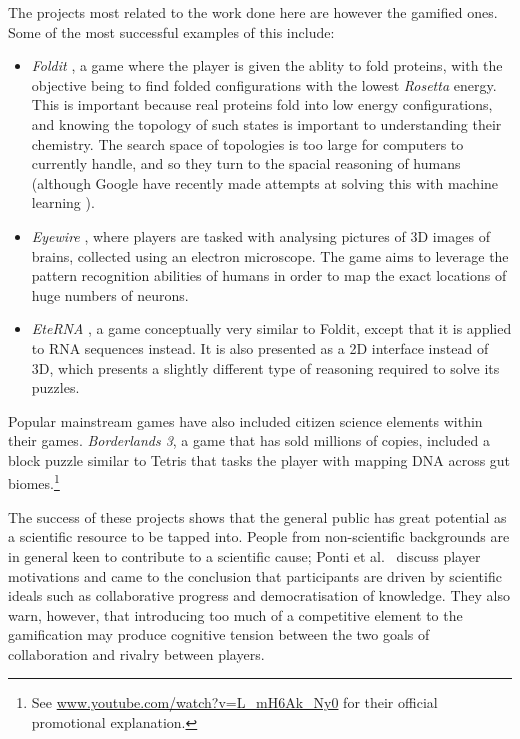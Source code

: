 The projects most related to the work done here are however the gamified ones. Some of the most successful examples of this include:
\begin{itemize}[leftmargin=*]
  \item \emph{Foldit} \cite{Cooper2010}, a game where the player is given the ablity to fold proteins, with the objective being to find folded configurations with the lowest \emph{Rosetta} energy. This is important because real proteins fold into low energy configurations, and knowing the topology of such states is important to understanding their chemistry. The search space of topologies is too large for computers to currently handle, and so they turn to the spacial reasoning of humans (although Google have recently made attempts at solving this with machine learning \cite{Senior2020}).
  \item \emph{Eyewire} \cite{Bae2018}, where players are tasked with analysing pictures of 3D images of brains, collected using an electron microscope. The game aims to leverage the pattern recognition abilities of humans in order to map the exact locations of huge numbers of neurons.
  \item \emph{EteRNA} \cite{Lee2014}, a game conceptually very similar to Foldit, except that it is applied to RNA sequences instead. It is also presented as a 2D interface instead of 3D, which presents a slightly different type of reasoning required to solve its puzzles.
\end{itemize}

Popular mainstream games have also included citizen science elements within their games. \emph{Borderlands 3}, a game that has sold millions of copies, included a block puzzle similar to Tetris that tasks the player with mapping DNA across gut biomes.\footnote{See \url{www.youtube.com/watch?v=L_mH6Ak_Ny0} for their official promotional explanation.}

The success of these projects shows that the general public has great potential as a scientific resource to be tapped into.
People from non-scientific backgrounds are in general keen to contribute to a scientific cause; Ponti et al.\ \cite{Ponti2018} discuss player motivations and came to the conclusion that participants are driven by scientific ideals such as collaborative progress and democratisation of knowledge. They also warn, however, that introducing too much of a competitive element to the gamification may produce cognitive tension between the two goals of collaboration and rivalry between players.

